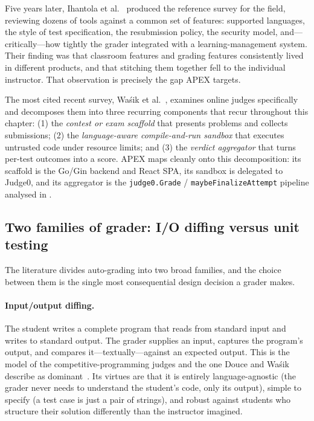 Five years later, Ihantola et al.~\cite{ihantola2010autograding} produced the reference
survey for the field, reviewing dozens of tools against a common set of features: supported
languages, the style of test specification, the resubmission policy, the security model,
and---critically---how tightly the grader integrated with a learning-management system.
Their finding was that classroom features and grading features consistently lived in
different products, and that stitching them together fell to the individual instructor.
That observation is precisely the gap APEX targets.

The most cited recent survey, Wa\'{s}ik et al.~\cite{wasik2018survey}, examines online
judges specifically and decomposes them into three recurring components that recur
throughout this chapter: (1) the \emph{contest or exam scaffold} that presents problems and
collects submissions; (2) the \emph{language-aware compile-and-run sandbox} that executes
untrusted code under resource limits; and (3) the \emph{verdict aggregator} that turns
per-test outcomes into a score. APEX maps cleanly onto this decomposition: its scaffold is
the Go/Gin backend and React SPA, its sandbox is delegated to Judge0, and its aggregator is
the \texttt{judge0.Grade} / \texttt{maybeFinalizeAttempt} pipeline analysed in
.

\subsection{Two families of grader: I/O diffing versus unit testing}

The literature divides auto-grading into two broad families, and the choice between them is
the single most consequential design decision a grader makes.

\paragraph{Input/output diffing.} The student writes a complete program that reads from
standard input and writes to standard output. The grader supplies an input, captures the
program's output, and compares it---textually---against an expected output. This is the
model of the competitive-programming judges and the one Douce and Wa\'{s}ik describe as
dominant~\cite{douce2005autoassess,wasik2018survey}. Its virtues are that it is entirely
language-agnostic (the grader never needs to understand the student's code, only its
output), simple to specify (a test case is just a pair of strings), and robust against
students who structure their solution differently than the instructor imagined.

